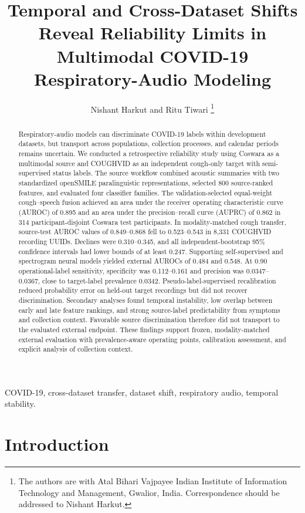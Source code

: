 \documentclass[journal]{IEEEtran}
\title{Temporal and Cross-Dataset Shifts Reveal Reliability Limits in Multimodal COVID-19 Respiratory-Audio Modeling}
\author{Nishant Harkut and Ritu Tiwari
\thanks{The authors are with Atal Bihari Vajpayee Indian Institute of Information Technology and Management, Gwalior, India. Correspondence should be addressed to Nishant Harkut.}
}
\begin{document}

\maketitle

\begin{abstract}
Respiratory-audio models can discriminate COVID-19 labels within development datasets, but transport across populations, collection processes, and calendar periods remains uncertain. We conducted a retrospective reliability study using Coswara as a multimodal source and COUGHVID as an independent cough-only target with semi-supervised status labels. The source workflow combined acoustic summaries with two standardized openSMILE paralinguistic representations, selected 800 source-ranked features, and evaluated four classifier families. The validation-selected equal-weight cough--speech fusion achieved an area under the receiver operating characteristic curve (AUROC) of 0.895 and an area under the precision--recall curve (AUPRC) of 0.862 in 314 participant-disjoint Coswara test participants. In modality-matched cough transfer, source-test AUROC values of 0.849--0.868 fell to 0.523--0.543 in 8,331 COUGHVID recording UUIDs. Declines were 0.310--0.345, and all independent-bootstrap 95\% confidence intervals had lower bounds of at least 0.247. Supporting self-supervised and spectrogram neural models yielded external AUROCs of 0.484 and 0.548. At 0.90 operational-label sensitivity, specificity was 0.112--0.161 and precision was 0.0347--0.0367, close to target-label prevalence 0.0342. Pseudo-label-supervised recalibration reduced probability error on held-out target recordings but did not recover discrimination. Secondary analyses found temporal instability, low overlap between early and late feature rankings, and strong source-label predictability from symptoms and collection context. Favorable source discrimination therefore did not transport to the evaluated external endpoint. These findings support frozen, modality-matched external evaluation with prevalence-aware operating points, calibration assessment, and explicit analysis of collection context.
\end{abstract}

\begin{IEEEkeywords}
COVID-19, cross-dataset transfer, dataset shift, respiratory audio, temporal stability.
\end{IEEEkeywords}

\section{Introduction}
\end{document}
